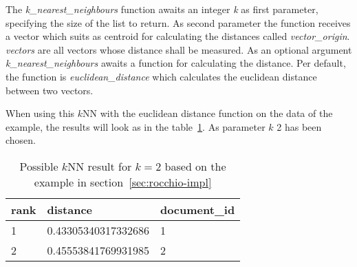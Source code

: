 The \textit{k\_nearest\_neighbours} function awaits an integer \textit{k} as first parameter, specifying the size of the list to return.
As second parameter the function receives a vector which suits as centroid for calculating the distances called \textit{vector\_origin}.
\textit{vectors} are all vectors whose distance shall be measured.
As an optional argument \textit{k\_nearest\_neighbours} awaits a function for calculating the distance.
Per default, the function is \textit{euclidean\_distance} which calculates the euclidean distance between two vectors.

When using this $k$NN with the euclidean distance function on the data of the example, the results will look as in the table~\ref{tab:knn-result}.
As parameter $k$ 2 has been chosen.

\begin{table}[h]
    \center
    \begin{tabular}{ l | l | l }
        \rowcolor{\dustRowHead}
        rank    & distance              & document\_id\\\hline
        1       & 0.43305340317332686   & 1\\
        2       & 0.45553841769931985   & 2\\
    \end{tabular}
    \caption{Possible $k$NN result for $k=2$ based on the example in section~\ref{sec:rocchio-impl}}
    \label{tab:knn-result}
\end{table}

